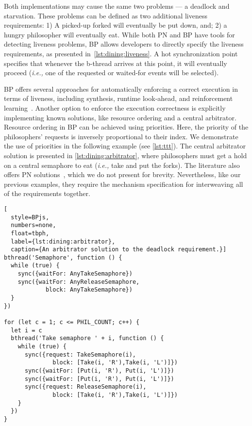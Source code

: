\documentclass[10pt,journal,compsoc]{IEEEtran}
\theoremstyle{definition}
\newcommand{\ie}{\emph{i.e.,}\xspace}
\begin{document}
Both implementations may cause the same two problems --- a deadlock and starvation. These problems can be defined as two additional liveness requirements: 1) A picked-up forked will eventually be put down, and; 2) a hungry philosopher will eventually eat. While both PN and BP have tools for detecting liveness problems, BP allows developers to directly specify the liveness requirements, as presented in~\autoref{lst:dining:liveness}. A hot synchronization point specifies that whenever the b-thread arrives  at this point, it will eventually proceed (\ie one of the requested or waited-for events will be selected). 

BP offers several approaches for automatically enforcing a correct execution in terms of liveness, including synthesis, runtime look-ahead, and reinforcement learning~\cite{Yaacov2021Thesis}.
Another option to enforce the execution correctness is explicitly implementing known solutions, like resource ordering and a central arbitrator. Resource ordering in BP can be achieved using priorities. Here, the priority of the philosophers' requests is inversely proportional to their index. We demonstrate the use of priorities in the following example (see \autoref{lst:ttt}). The central arbitrator solution is presented in \autoref{lst:dining:arbitrator}, where philosophers must get a hold on a central semaphore to eat (\ie take and put the forks). The literature also offers PN solutions~\cite{davidrajuh2014verifying}, which we do not present for brevity. Nevertheless, like our previous examples, they require the mechanism specification for interweaving all of the requirements together.

\begin{lstlisting}[
  style=BPjs,
  numbers=none,
  float=tbph,
  label={lst:dining:arbitrator},
  caption={An arbitrator solution to the deadlock requirement.}]
bthread('Semaphore', function () {
  while (true) {
    sync({waitFor: AnyTakeSemaphore})
    sync({waitFor: AnyReleaseSemaphore, 
            block: AnyTakeSemaphore})
  }
})

for (let c = 1; c <= PHIL_COUNT; c++) {
  let i = c
  bthread('Take semaphore ' + i, function () {
    while (true) {
      sync({request: TakeSemaphore(i), 
              block: [Take(i, 'R'),Take(i, 'L')]})
      sync({waitFor: [Put(i, 'R'), Put(i, 'L')]})
      sync({waitFor: [Put(i, 'R'), Put(i, 'L')]})
      sync({request: ReleaseSemaphore(i), 
              block: [Take(i, 'R'),Take(i, 'L')]})
    }
  })
}
\end{lstlisting}
\end{document}
